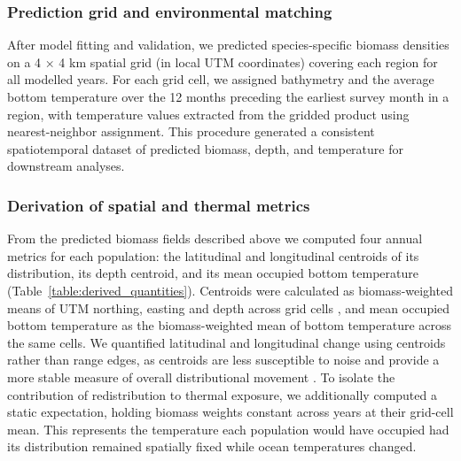 \documentclass[9pt,twocolumn,twoside]{pnas-new}
\begin{document}
{\subsubsection*{Prediction grid and environmental matching} 
After model fitting and validation, we predicted species-specific biomass densities on a 4 × 4 km spatial
grid (in local UTM coordinates) covering each region for all modelled years. For each grid cell, we assigned bathymetry and the average bottom temperature over the 12 months preceding the earliest survey month in a region, with temperature values extracted from the gridded product using nearest-neighbor assignment. This procedure generated a consistent spatiotemporal dataset of predicted biomass, depth, and temperature for downstream analyses.

\subsubsection*{Derivation of spatial and thermal metrics}
From the predicted biomass fields described above we computed four annual metrics for each population: the latitudinal and longitudinal centroids of its distribution, its depth centroid, and its mean occupied bottom temperature (Table~\ref{table:derived_quantities}). Centroids were calculated as biomass-weighted means of UTM northing, easting and depth across grid cells \citep{thorson_model-based_2016}, and mean occupied bottom temperature as the biomass-weighted mean of bottom temperature across the same cells. We quantified latitudinal and longitudinal change using centroids rather than range edges, as centroids are less susceptible to noise and provide a more stable measure of overall distributional movement \citep{shoo_detecting_2006}. To isolate the contribution of redistribution to thermal exposure, we additionally computed a static expectation, holding biomass weights constant across years at their grid-cell mean. This represents the temperature each population would have occupied had its distribution remained spatially fixed while ocean temperatures changed.

}
\end{document}
